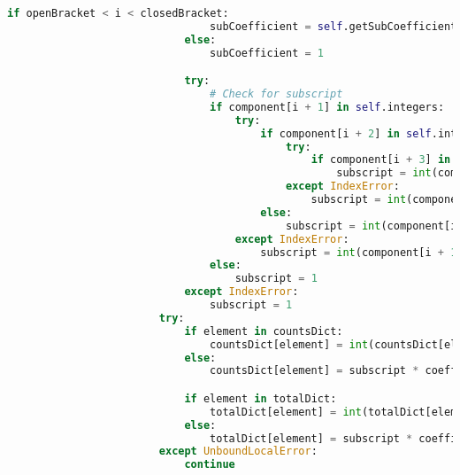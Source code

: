 \documentclass[a4paper,12pt]{article}
\begin{document}
\begin{lstlisting}[language=Python, caption=parseComponent method for finding elements, label={lst:parsecomponent}]
                            if openBracket < i < closedBracket:
                                subCoefficient = self.getSubCoefficient(component)
                            else:
                                subCoefficient = 1

                            try:
                                # Check for subscript
                                if component[i + 1] in self.integers:
                                    try:
                                        if component[i + 2] in self.integers:
                                            try:
                                                if component[i + 3] in self.integers:
                                                    subscript = int(component[i + 1: i + 4])
                                            except IndexError:
                                                subscript = int(component[i + 1: i + 3])
                                        else:
                                            subscript = int(component[i + 1])
                                    except IndexError:
                                        subscript = int(component[i + 1])
                                else:
                                    subscript = 1
                            except IndexError:
                                subscript = 1
                        try:
                            if element in countsDict:
                                countsDict[element] = int(countsDict[element]) + subscript * coefficient * subCoefficient
                            else:
                                countsDict[element] = subscript * coefficient * subCoefficient

                            if element in totalDict:
                                totalDict[element] = int(totalDict[element]) + subscript * coefficient * subCoefficient
                            else:
                                totalDict[element] = subscript * coefficient * subCoefficient
                        except UnboundLocalError:
                            continue


\end{lstlisting}
\end{document}
